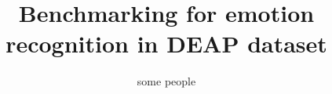 \documentclass{sig-alternate}
\begin{document}
%

\title{Benchmarking for emotion recognition in DEAP dataset}


%
%
%
%
%

%
\author{
%
%
\alignauthor
some people
}


\end{document}
